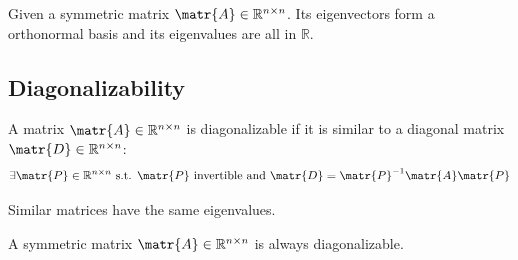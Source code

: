 \begin{theorem} 
    Given a symmetric matrix $\matr{A} \in \mathbb{R}^{n \times n}$.
    Its eigenvectors form a orthonormal basis and its eigenvalues are all in $\mathbb{R}$.
\end{theorem}


\subsection{Diagonalizability}
A matrix $\matr{A} \in \mathbb{R}^{n \times n}$ is diagonalizable if it is similar to a diagonal matrix $\matr{D} \in \mathbb{R}^{n \times n}$:
\[ \exists \matr{P} \in \mathbb{R}^{n \times n} \text{ s.t. } \matr{P} \text{ invertible and } \matr{D} = \matr{P}^{-1}\matr{A}\matr{P} \]

\begin{theorem}
    Similar matrices have the same eigenvalues.
\end{theorem}

\begin{theorem} 
    A symmetric matrix $\matr{A} \in \mathbb{R}^{n \times n}$ is always diagonalizable.
\end{theorem}